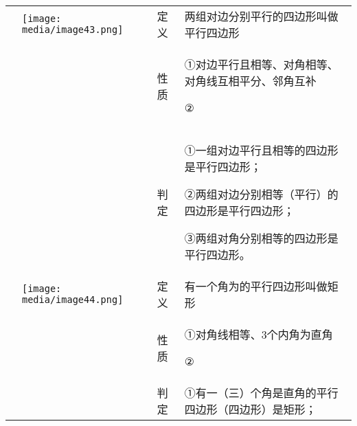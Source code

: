\documentclass[a4paper,11pt,UTF8]{ctexart}
\begin{document}
\begin{longtable}[]{@{}llll@{}}
\toprule
\endhead
& \texttt{[image: media/image43.png]}
& 定义 & 两组对边分别平行的四边形叫做平行四边形\tabularnewline
\begin{minipage}[t]{0.22\columnwidth}\raggedright
\strut
\end{minipage} & \begin{minipage}[t]{0.22\columnwidth}\raggedright
\strut
\end{minipage} & \begin{minipage}[t]{0.22\columnwidth}\raggedright
性质\strut
\end{minipage} & \begin{minipage}[t]{0.22\columnwidth}\raggedright
①对边平行且相等、对角相等、对角线互相平分、邻角互补

②\strut
\end{minipage}\tabularnewline
\begin{minipage}[t]{0.22\columnwidth}\raggedright
\strut
\end{minipage} & \begin{minipage}[t]{0.22\columnwidth}\raggedright
\strut
\end{minipage} & \begin{minipage}[t]{0.22\columnwidth}\raggedright
判定\strut
\end{minipage} & \begin{minipage}[t]{0.22\columnwidth}\raggedright
①一组对边平行且相等的四边形是平行四边形；

②两组对边分别相等（平行）的四边形是平行四边形；

③两组对角分别相等的四边形是平行四边形。\strut
\end{minipage}\tabularnewline
& \texttt{[image: media/image44.png]} &
定义 & 有一个角为的平行四边形叫做矩形\tabularnewline
\begin{minipage}[t]{0.22\columnwidth}\raggedright
\strut
\end{minipage} & \begin{minipage}[t]{0.22\columnwidth}\raggedright
\strut
\end{minipage} & \begin{minipage}[t]{0.22\columnwidth}\raggedright
性质\strut
\end{minipage} & \begin{minipage}[t]{0.22\columnwidth}\raggedright
①对角线相等、3个内角为直角

②\strut
\end{minipage}\tabularnewline
\begin{minipage}[t]{0.22\columnwidth}\raggedright
\strut
\end{minipage} & \begin{minipage}[t]{0.22\columnwidth}\raggedright
\strut
\end{minipage} & \begin{minipage}[t]{0.22\columnwidth}\raggedright
判定\strut
\end{minipage} & \begin{minipage}[t]{0.22\columnwidth}\raggedright
①有一（三）个角是直角的平行四边形（四边形）是矩形；


\end{minipage}
\end{longtable}
\end{document}
